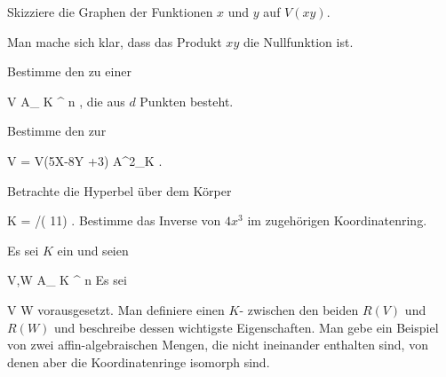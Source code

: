 {}
{





Skizziere die Graphen der Funktionen $x$ und $y$ auf $V(xy)$.





}
{Man mache sich klar, dass das Produkt $xy$ die Nullfunktion ist.} {}

{}
{





Bestimme den
zu einer

\mavergleichskette
{\vergleichskette
{V
}
{ \subseteq }{ { {\mathbb A}_{  K }^{  n   } }
}
{  }{
}
{    }{
}
{   }{
}
}
{}{}{,}
die aus $d$ Punkten besteht.





}
{} {}

{}
{





Bestimme den
zur

\mavergleichskette
{\vergleichskette
{V
}
{ = }{ V(5X-8Y +3)
}
{ \subseteq }{ {\mathbb A}^{2}_{K}
}
{    }{
}
{   }{
}
}
{}{}{.}





}
{} {}

{}
{





Betrachte die Hyperbel
 über dem Körper

\mavergleichskette
{\vergleichskette
{ K
}
{ = }{ \Z/( 11)
}
{  }{
}
{    }{
}
{   }{
}
}
{}{}{.}
Bestimme das Inverse von $4x^3$ im zugehörigen Koordinatenring.





}
{} {}

{}
{





Es sei $K$ ein
und seien

\mavergleichskette
{\vergleichskette
{ V,W
}
{ \subseteq }{ { {\mathbb A}_{  K }^{  n   } }
}
{  }{
}
{    }{
}
{   }{
}
}
{}{}{}
Es sei

\mavergleichskette
{\vergleichskette
{ V
}
{ \subseteq }{ W
}
{  }{
}
{    }{
}
{   }{
}
}
{}{}{}
vorausgesetzt. Man definiere einen
$K$-
zwischen den beiden
$R(V)$ und $R(W)$ und beschreibe dessen wichtigste Eigenschaften. Man gebe ein Beispiel von zwei affin-algebraischen Mengen, die nicht ineinander enthalten sind, von denen aber die Koordinatenringe isomorph sind.





}
{} {}

